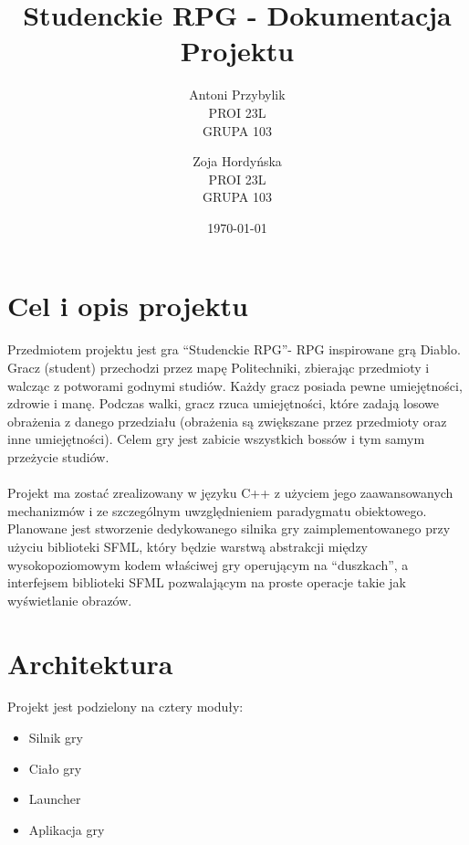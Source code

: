 \documentclass[12pt, titlepage]{article}
\author{Antoni Przybylik \\ PROI 23L \\ GRUPA 103 \and
	Zoja Hordyńska \\ PROI 23L \\ GRUPA 103}
\date{\today}
\title{Studenckie RPG - Dokumentacja Projektu}
\begin{document}
\maketitle
\justifying



\hypersetup{
	colorlinks=true,
	linkcolor=blue,
}

\lstset{style=listingstyle}

\section{Cel i opis projektu}
Przedmiotem projektu jest gra "`Studenckie RPG"'- RPG
inspirowane grą Diablo. Gracz (student) przechodzi
przez mapę Politechniki, zbierając przedmioty i
walcząc z potworami godnymi studiów. Każdy gracz
posiada pewne umiejętności, zdrowie i manę.
Podczas walki, gracz rzuca umiejętności, które
zadają losowe obrażenia z danego przedziału
(obrażenia są zwiększane przez przedmioty oraz
inne umiejętności). Celem gry jest zabicie
wszystkich bossów i tym samym przeżycie studiów.
\\~\\
Projekt ma zostać zrealizowany w języku C++ z użyciem
jego zaawansowanych mechanizmów i ze szczególnym
uwzględnieniem paradygmatu obiektowego. Planowane
jest stworzenie dedykowanego silnika gry
zaimplementowanego przy użyciu biblioteki SFML, który
będzie warstwą abstrakcji między wysokopoziomowym
kodem właściwej gry operującym na "`duszkach"', a
interfejsem biblioteki SFML pozwalającym na
proste operacje takie jak wyświetlanie obrazów.

\newpage
\section{Architektura}
Projekt jest podzielony na cztery moduły:
\begin{itemize}
	\item Silnik gry
	\item Ciało gry
	\item Launcher
	\item Aplikacja gry
\end{itemize}
\end{document}
